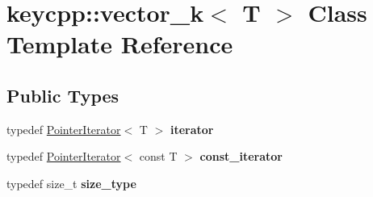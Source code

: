 \hypertarget{classkeycpp_1_1vector__k}{\section{keycpp\-:\-:vector\-\_\-k$<$ T $>$ Class Template Reference}
\label{classkeycpp_1_1vector__k}
}
\subsection*{Public Types}
\begin{DoxyCompactItemize}
\item 
\hypertarget{classkeycpp_1_1vector__k_a0c53a4d249da380a1eec01c56176de9c}{typedef \hyperlink{classkeycpp_1_1_pointer_iterator}{Pointer\-Iterator}$<$ T $>$ {\bfseries iterator}}\label{classkeycpp_1_1vector__k_a0c53a4d249da380a1eec01c56176de9c}

\item 
\hypertarget{classkeycpp_1_1vector__k_a7f0415773f7c1b1cac7699d141ed1d3b}{typedef \hyperlink{classkeycpp_1_1_pointer_iterator}{Pointer\-Iterator}$<$ const T $>$ {\bfseries const\-\_\-iterator}}\label{classkeycpp_1_1vector__k_a7f0415773f7c1b1cac7699d141ed1d3b}

\item 
\hypertarget{classkeycpp_1_1vector__k_a66a8ed8296d754341cedd8b242fc980a}{typedef size\-\_\-t {\bfseries size\-\_\-type}}\label{classkeycpp_1_1vector__k_a66a8ed8296d754341cedd8b242fc980a}

\end{DoxyCompactItemize}
